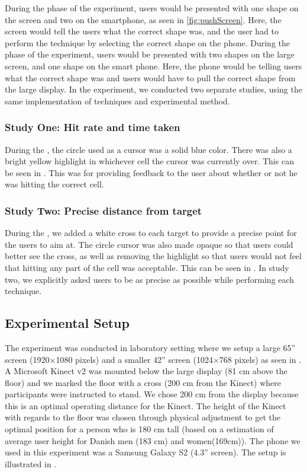During the \push phase of the experiment, users would be presented with one shape on the screen and two on the smartphone, as seen in \cref{fig:pushScreen}.
Here, the screen would tell the users what the correct shape was, and the user had to perform the technique by selecting the correct shape on the phone.
During the \pull phase of the experiment, users would be presented with two shapes on the large screen, and one shape on the smart phone.
Here, the phone would be telling users what the correct shape was and users would have to pull the correct shape from the large display. 
In the experiment, we conducted two separate studies, using the same implementation of techniques and experimental method. 

\subsubsection{Study One: Hit rate and time taken} 
During the \target, the circle used as a cursor was a solid blue color. 
There was also a bright yellow highlight in whichever cell the cursor was currently over.
This can be seen in .
This was for providing feedback to the user about whether or not he was hitting the correct cell. 

\subsubsection{Study Two: Precise distance from target}
During the \accuracy, we added a white cross to each target to provide a precise point for the users to aim at.
The circle cursor was also made opaque so that users could better see the cross, as well as removing the highlight so that users would not feel that hitting any part of the cell was acceptable.
This can be seen in .
In study two, we explicitly asked users to be as precise as possible while performing each technique.

\subsection{Experimental Setup} \label{sec:setup}
The experiment was conducted in laboratory setting where we setup a large 65'' screen (1920$\times$1080 pixels) and a smaller 42'' screen (1024$\times$768 pixels) as seen in .
A Microsoft Kinect v2 was mounted below the large display (81 cm above the floor) and we marked the floor with a cross (200 cm from the Kinect) where participants were instructed to stand.
We chose 200 cm from the display because this is an optimal operating distance for the Kinect.
The height of the Kinect with regards to the floor was chosen through physical adjustment to get the optimal position for a person who is 180 cm tall (based on a estimation of average user height for Danish men (183 cm) and women(169cm)).
The phone we used in this experiment was a Samsung Galaxy S2 (4.3'' screen).
The setup is illustrated in .

